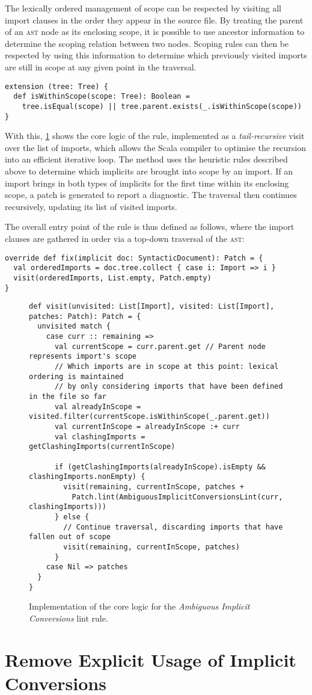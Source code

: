 \documentclass[../../main.tex]{subfiles}
\begin{document}
The lexically ordered management of scope can be respected by visiting all import clauses in the order they appear in the source file.
By treating the parent of an \textsc{ast} node as its enclosing scope, it is possible to use ancestor information to determine the scoping relation between two nodes.
Scoping rules can then be respected by using this information to determine which previously visited imports are still in scope at any given point in the traversal.
\begin{verbatim}
extension (tree: Tree) {
  def isWithinScope(scope: Tree): Boolean =
    tree.isEqual(scope) || tree.parent.exists(_.isWithinScope(scope))
}
\end{verbatim}
%
With this, \cref{fig:ambiguous-implicits-impl} shows the core logic of the rule, implemented as a \emph{tail-recursive} visit over the list of imports, which allows the Scala compiler to optimise the recursion into an efficient iterative loop.
The  method uses the heuristic rules described above to determine which implicits are brought into scope by an import.
If an import brings in both types of implicits for the first time within its enclosing scope, a patch is generated to report a diagnostic.
The traversal then continues recursively, updating its list of visited imports.

The overall entry point of the rule is thus defined as follows, where the import clauses are gathered in order via a top-down traversal of the \textsc{ast}:
\begin{verbatim}
override def fix(implicit doc: SyntacticDocument): Patch = {
  val orderedImports = doc.tree.collect { case i: Import => i }
  visit(orderedImports, List.empty, Patch.empty)
}
\end{verbatim}

\begin{figure}[htbp]
\begin{verbatim}
def visit(unvisited: List[Import], visited: List[Import], patches: Patch): Patch = {
  unvisited match {
    case curr :: remaining =>
      val currentScope = curr.parent.get // Parent node represents import's scope
      // Which imports are in scope at this point: lexical ordering is maintained
      // by only considering imports that have been defined in the file so far
      val alreadyInScope = visited.filter(currentScope.isWithinScope(_.parent.get))
      val currentInScope = alreadyInScope :+ curr
      val clashingImports = getClashingImports(currentInScope)

      if (getClashingImports(alreadyInScope).isEmpty && clashingImports.nonEmpty) {
        visit(remaining, currentInScope, patches +
          Patch.lint(AmbiguousImplicitConversionsLint(curr, clashingImports)))
      } else {
        // Continue traversal, discarding imports that have fallen out of scope
        visit(remaining, currentInScope, patches)
      }
    case Nil => patches
  }
}
\end{verbatim}
\caption{Implementation of the core logic for the \emph{Ambiguous Implicit Conversions} lint rule.}
\label{fig:ambiguous-implicits-impl}
\end{figure}

\section{Remove Explicit Usage of Implicit Conversions}
\end{document}
